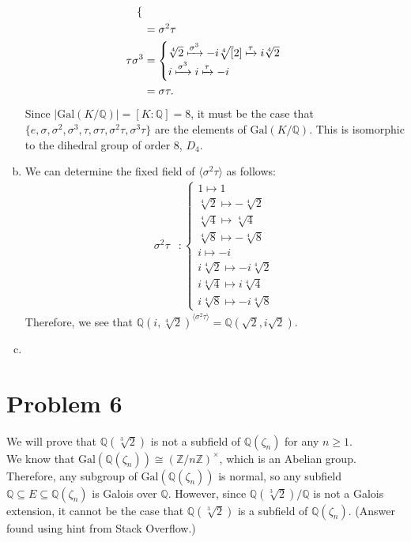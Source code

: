 \documentclass[10pt]{extarticle}
\newcommand{\Q}{\mathbb{Q}}
\newcommand{\Z}{\mathbb{Z}}
\begin{document}
\begin{enumerate}[(a)]
\begin{align*}
\begin{cases}
              \end{cases}\\
                           &= \sigma^2\tau\\
                \tau\sigma^3 &= \begin{cases}
                  \sqrt[4]{2} \xmapsto{\sigma^3}-i\sqrt[4][2]\xmapsto{\tau}i\sqrt[4]{2}\\
                  i \xmapsto{\sigma^3}i\xmapsto{\tau}-i
                \end{cases}\\
                             &= \sigma\tau.
      \end{align*}
      Since $|\text{Gal}(K/\Q)| = [K:\Q] = 8$, it must be the case that $\{e,\sigma,\sigma^2,\sigma^3,\tau,\sigma\tau,\sigma^2\tau,\sigma^3\tau\}$ are the elements of $\text{Gal}(K/\Q)$. This is isomorphic to the dihedral group of order 8, $D_4$.
    \item We can determine the fixed field of $\langle \sigma^2\tau\rangle$ as follows:
        \begin{align*}
          \sigma^2\tau &: \begin{cases}
            1 \mapsto 1\\
            \sqrt[4]{2} \mapsto -\sqrt[4]{2}\\
            \sqrt[4]{4} \mapsto \sqrt[4]{4}\\
            \sqrt[4]{8} \mapsto -\sqrt[4]{8}\\
            i\mapsto -i\\
            i\sqrt[4]{2} \mapsto -i\sqrt[4]{2}\\
            i\sqrt[4]{4} \mapsto i\sqrt[4]{4}\\
            i\sqrt[4]{8} \mapsto -i\sqrt[4]{8}
          \end{cases}
        \end{align*}
        Therefore, we see that $\Q(i,\sqrt[4]{2})^{\langle \sigma^2\tau\rangle} = \Q(\sqrt{2},i\sqrt{2})$. 
      \item 
  \end{enumerate}
  \section{Problem 6}%
  We will prove that $\Q(\sqrt[3]{2})$ is not a subfield of $\Q(\zeta_n)$ for any $n\geq 1$.\\

  We know that $\text{Gal}(\Q(\zeta_n))\cong \left(\Z/n\Z\right)^{\times}$, which is an Abelian group. Therefore, any subgroup of $\text{Gal}\left(\Q(\zeta_n)\right)$ is normal, so any subfield $\Q \subseteq E\subseteq \Q(\zeta_n)$ is Galois over $\Q$. However, since $\Q(\sqrt[3]{2})/\Q$ is not a Galois extension, it cannot be the case that $\Q(\sqrt[3]{2})$ is a subfield of $\Q(\zeta_n)$. (Answer found using hint from Stack Overflow.)
\end{document}
